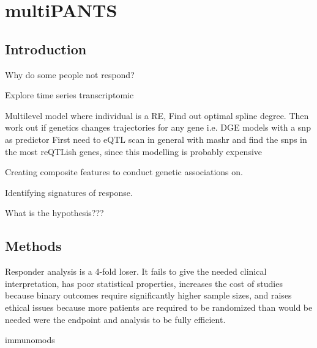 %
%

\chapter{multiPANTS}

\section{Introduction}

Why do some people not respond?

Explore time series transcriptomic

Multilevel model where individual is a RE, 
Find out optimal spline degree.
Then work out if genetics changes trajectories for any gene i.e. DGE models with a snp as predictor
First need to eQTL scan in general with mashr and find the snps in the most reQTLish genes, since this modelling is probably expensive

Creating composite features to conduct genetic associations on.

Identifying signatures of response.

What is the hypothesis???


\section{Methods}


Responder analysis is a 4-fold loser. It fails to give the needed clinical
interpretation, has poor statistical properties, increases the cost of studies
because binary outcomes require significantly higher sample sizes, and raises
ethical issues because more patients are required to be randomized than would
be needed were the endpoint and analysis to be fully efficient.

immunomods

